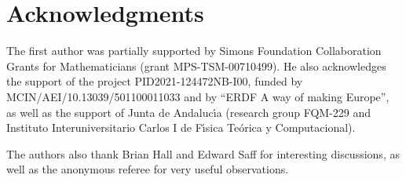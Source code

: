 \documentclass[reqno,11pt]{amsart}
\theoremstyle{plain}
\theoremstyle{definition}
\theoremstyle{remark}
\numberwithin{equation}{section}
\numberwithin{equation}{section}
\begin{document}
\section*{Acknowledgments}

The first author was partially supported by Simons Foundation Collaboration Grants for Mathematicians (grant MPS-TSM-00710499).
He also acknowledges the support of the project PID2021-124472NB-I00, funded by MCIN/AEI/10.13039/501100011033 and by ``ERDF A way of making Europe'', as well as the support of Junta de Andaluc\'{\i}a (research group FQM-229 and Instituto Interuniversitario Carlos I de F\'{\i}sica Te\'orica y Computacional). 

The authors also thank Brian Hall and Edward Saff for interesting discussions, as well as the anonymous referee for very useful observations.
\end{document}
